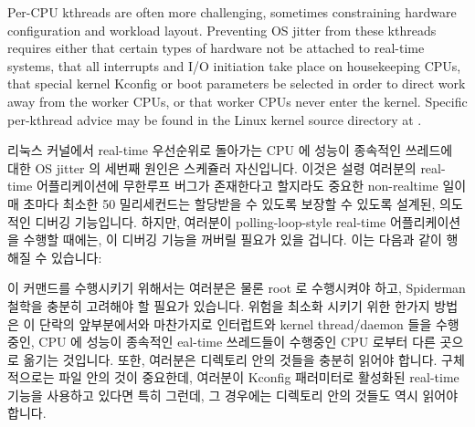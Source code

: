 Per-CPU kthreads are often more challenging, sometimes constraining
hardware configuration and workload layout.
Preventing OS jitter from these kthreads requires either that certain
types of hardware
not be attached to real-time systems, that all interrupts and I/O
initiation take place on housekeeping CPUs, that special kernel
Kconfig or boot parameters be selected in order to direct work away from
the worker CPUs, or that worker CPUs never enter the kernel.
Specific per-kthread advice may be found in the Linux kernel source
 directory at .
\fi

리눅스 커널에서 real-time 우선순위로 돌아가는 CPU 에 성능이 종속적인 쓰레드에
대한 OS jitter 의 세번째 원인은 스케쥴러 자신입니다.
이것은 설령 여러분의 real-time 어플리케이션에 무한루프 버그가 존재한다고
할지라도 중요한 non-realtime 일이 매 초마다 최소한 50 밀리세컨드는 할당받을 수
있도록 보장할 수 있도록 설계된, 의도적인 디버깅 기능입니다.
하지만, 여러분이 polling-loop-style real-time 어플리케이션을 수행할 때에는, 이
디버깅 기능을 꺼버릴 필요가 있을 겁니다.
이는 다음과 같이 행해질 수 있습니다:

{
	\scriptsize
}

이 커맨드를 수행시키기 위해서는 여러분은 물론 root 로 수행시켜야 하고,
Spiderman 철학을 충분히 고려해야 할 필요가 있습니다.
위험을 최소화 시키기 위한 한가지 방법은 이 단락의 앞부분에서와 마찬가지로
인터럽트와 kernel thread/daemon 들을 수행중인, CPU 에 성능이 종속적인 eal-time
쓰레드들이 수행중인 CPU 로부터 다른 곳으로 옮기는 것입니다.
또한, 여러분은  디렉토리 안의 것들을 충분히
읽어야 합니다.
구체적으로는  파일 안의 것이 중요한데, 여러분이
 Kconfig 패러미터로 활성화된  real-time
기능을 사용하고 있다면 특히 그런데, 그 경우에는 
디렉토리 안의 것들도 역시 읽어야 합니다.

